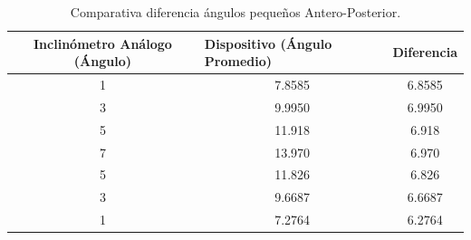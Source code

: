 \documentclass[12pt,a4paper]{article}
\begin{document}
\begin{table}[H]
	\centering
	\begin{tabular}{|c|c|c|}
		\hline
		\textbf{Inclinómetro Análogo (Ángulo)} & \multicolumn{1}{l|}{\textbf{Dispositivo (Ángulo Promedio)}} & Diferencia 				\\ \hline
		1                                      & 7.8585                                                      & 6.8585                     \\ \hline
		3                                      & 9.9950                                                      & 6.9950                    \\ \hline
		5                                      & 11.918                                                      & 6.918                     \\ \hline
		7                                      & 13.970                                                      & 6.970                     \\ \hline
		5                                      & 11.826                                                      & 6.826                      \\ \hline
		3                                      & 9.6687                                                      & 6.6687                     \\ \hline
		1                                      & 7.2764                                                      & 6.2764                     \\ \hline
	\end{tabular}
	\caption{Comparativa diferencia ángulos pequeños Antero-Posterior.}
	\label{table:inclinometroVsDispositivoAP}
\end{table}
\end{document}
